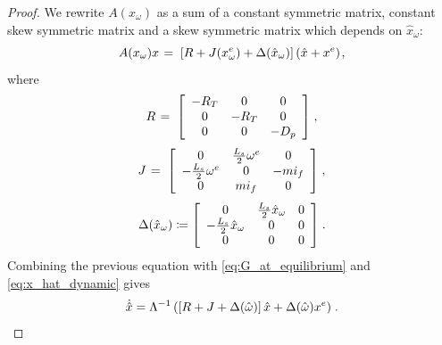 \documentclass[letterpaper, 10 pt, conference]{ieeeconf}
\renewcommand{\o}    {{\omega}}
\newcommand{\m}      {{\hbox{\hskip 1pt}}}
\begin{document}
\begin{proof}
We rewrite $A(x_\o)$ as a sum of a constant symmetric matrix, constant
skew symmetric matrix and a skew symmetric matrix which depends on
$\hat{x}_\o$:
$$ A(x_\o)x \m=\m \left[R+J(x_\o^e)+\Delta(\hat{x}_\o)\right]
   (\hat{x}+x^e) \m,$$
where
$$ R \m=\m \left[\begin{array}{ccc} -R_T & 0 & 0\\
   0 & -R_T & 0\\ 0 & 0 & -D_{p}
\end{array}\right] \m,$$
$$ J \m=\m \left[\begin{array}{ccc} 0 & \frac{L_s}{2}\o^e
   & 0\\ -\frac{L_s}{2}\o^e & 0 & -mi_f\\ 0 & mi_f & 0
   \end{array}\right] \m,$$
$$ \Delta(\hat{x}_\o)\coloneqq\left[\begin{array}{ccc}
   0 & \frac{L_{s}}{2}\hat{x}_{\omega} & 0\\
   -\frac{L_{s}}{2}\hat{x}_\o & 0 & 0\\
   0 & 0 & 0 \end{array}\right] \m.$$
Combining the previous equation with \eqref{eq:G_at_equilibrium} and
\eqref{eq:x_hat_dynamic} gives
$$ \dot{\hat{x}}=\Lambda^{-1}\left( \left[R+J+\Delta(\hat{\o})
   \right]\hat{x}+\Delta(\hat{\o})x^e\right) \m.$$


\end{proof}
\end{document}
